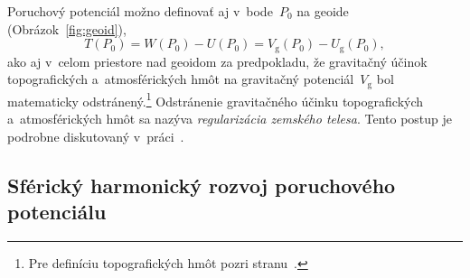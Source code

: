 \documentclass[a4paper, 12pt]{book}
\newcommand{\gidx}{\mathrm g}
\begin{document}
Poruchový potenciál možno definovať aj v~bode~$P_0$ na geoide 
(Obrázok~\ref{fig:geoid}),
%
\begin{equation}
T(P_0) = W(P_0) - U(P_0) = V_\gidx(P_0) - U_\gidx(P_0){,}
\end{equation}
%
ako aj v~celom priestore nad geoidom za predpokladu, že gravitačný účinok 
topografických a~atmosférických hmôt na gravitačný potenciál~$V_\gidx$ bol 
matematicky odstránený.\footnote{Pre definíciu topografických hmôt pozri 
stranu~\pageref{def:topographic_masses}.}  Odstránenie gravitačného účinku 
topografických a~atmosférických hmôt sa nazýva \emph{regularizácia zemského 
telesa}.  Tento postup je podrobne diskutovaný v~práci~\textcite{Janak2006}.


\subsection{Sférický harmonický rozvoj poruchového potenciálu}
\end{document}
